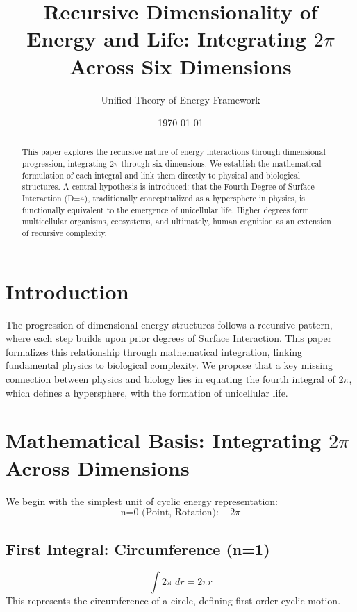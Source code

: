 \documentclass{article}
\title{Recursive Dimensionality of Energy and Life: Integrating $2\pi$ Across Six Dimensions}
\author{Unified Theory of Energy Framework}
\date{\today}
\begin{document}
\maketitle

\begin{abstract}
This paper explores the recursive nature of energy interactions through dimensional progression, integrating $2\pi$ through six dimensions. We establish the mathematical formulation of each integral and link them directly to physical and biological structures. A central hypothesis is introduced: that the Fourth Degree of Surface Interaction (D=4), traditionally conceptualized as a hypersphere in physics, is functionally equivalent to the emergence of unicellular life. Higher degrees form multicellular organisms, ecosystems, and ultimately, human cognition as an extension of recursive complexity.
\end{abstract}

\section{Introduction}
The progression of dimensional energy structures follows a recursive pattern, where each step builds upon prior degrees of Surface Interaction. This paper formalizes this relationship through mathematical integration, linking fundamental physics to biological complexity. We propose that a key missing connection between physics and biology lies in equating the fourth integral of $2\pi$, which defines a hypersphere, with the formation of unicellular life.

\section{Mathematical Basis: Integrating $2\pi$ Across Dimensions}

We begin with the simplest unit of cyclic energy representation:
\begin{equation}
\text{n=0 (Point, Rotation)}: \quad 2\pi
\end{equation}

\subsection{First Integral: Circumference (n=1)}
\begin{equation}
\int 2\pi \; dr = 2\pi r
\end{equation}
This represents the circumference of a circle, defining first-order cyclic motion.
\end{document}
